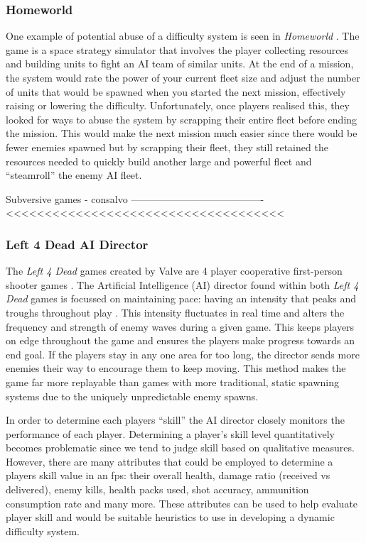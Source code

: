 \documentclass[journal]{IEEEtran}
\begin{document}
\subsubsection{Homeworld}
One example of potential abuse of a difficulty system is seen in \textit{Homeworld} \cite{game:homeworld}. The game is a space strategy simulator that involves the player collecting resources and building units to fight an AI team of similar units. At the end of a mission, the system would rate the power of your current fleet size and adjust the number of units that would be spawned when you started the next mission, effectively raising or lowering the difficulty. Unfortunately, once players realised this, they looked for ways to abuse the system by scrapping their entire fleet before ending the mission. This would make the next mission much easier since there would be fewer enemies spawned but by scrapping their fleet, they still retained the resources needed to quickly build another large and powerful fleet and ``steamroll'' the enemy AI fleet. 

Subversive games -  consalvo 
----------------------------------------<<<<<<<<<<<<<<<<<<<<<<<<<<<<<<<<<<<<

\subsubsection{Left 4 Dead AI Director}
The \textit{Left 4 Dead} games created by Valve are 4 player cooperative first-person shooter games \cite{game:left4dead} \cite{game:left4dead2}. The Artificial Intelligence (AI) director found within both \textit{Left 4 Dead} games is focussed on maintaining pace: having an intensity that peaks and troughs throughout play \cite{booth2009ai}. This intensity fluctuates in real time and alters the frequency and strength of enemy waves during a given game. This keeps players on edge throughout the game and ensures the players make progress towards an end goal. If the players stay in any one area for too long, the director sends more enemies their way to encourage them to keep moving. This method makes the game far more replayable than games with more traditional, static spawning systems due to the uniquely unpredictable enemy spawns.

In order to determine each players ``skill'' the AI director closely monitors the performance of each player. Determining a player's skill level quantitatively becomes problematic since we tend to judge skill based on qualitative measures. However, there are many attributes that could be employed to determine a players skill value in an fps: their overall health, damage ratio (received vs delivered), enemy kills, health packs used, shot accuracy, ammunition consumption rate and many more. These attributes can be used to help evaluate player skill and would be suitable heuristics to use in developing a dynamic difficulty system.
\end{document}
